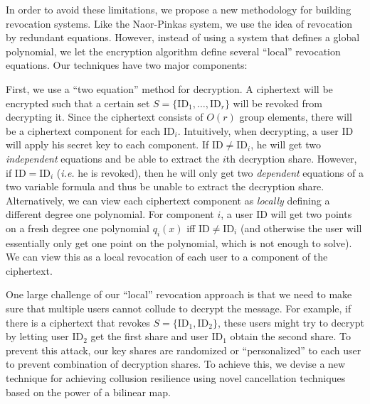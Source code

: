 \documentclass[a4paper, 11pt]{article}
\newcommand{\comment}[1]{}
\theoremstyle{definition}
\newcommand{\ID}{\ensuremath{\textrm{ID}}}
\begin{document}
In order to avoid these limitations, we propose a new methodology for
building revocation systems. Like the Naor-Pinkas system, we use the
idea of revocation by redundant equations. However, instead of using
a system that defines a global polynomial, we let the encryption algorithm
define several ``local'' revocation equations.
Our techniques have two major components:


First, we use a ``two equation'' method for decryption. A ciphertext
will be encrypted such that a certain set $S=\{\ID_1,\ldots,\ID_r \}$
will be revoked from decrypting it. Since the ciphertext consists of
$O(r)$ group elements, there will be a ciphertext component for each
$\ID_i$.  Intuitively, when decrypting, a user $\ID$ will apply his
secret key to each component. If $\ID \neq \ID_i$, he will get two
\emph{independent} equations and be able to extract the $i$th
decryption share. However, if $\ID=\ID_i$ (\emph{i.e.} he is revoked), then he
will only get two \emph{dependent} equations of a two variable formula and thus
be unable to extract the decryption share. Alternatively, we can view each
ciphertext component as \emph{locally} defining a different degree one polynomial.
For component $i$, a user $\ID$ will get two points on a fresh degree one polynomial
$q_i(x)$ iff $\ID \neq \ID_i$ (and otherwise the user will essentially only get one point on the polynomial, which is not enough to solve). We can view this as a local
revocation of each user to a component of the ciphertext.


One large challenge of our ``local'' revocation approach is that we
need to make sure that multiple users cannot collude to decrypt the
message. For example, if there is a ciphertext that revokes $S= \{
\ID_1,\ID_2 \}$, these users might try to decrypt by letting user
$\ID_2$ get the first share and user $\ID_1$ obtain the second share.
To prevent this attack, our key shares are randomized or
``personalized'' to each user to prevent combination of decryption
shares. To achieve this, we devise a new technique for achieving
collusion resilience using novel cancellation techniques based on the
power of a bilinear map.


\comment{
Our techniques are in contrast to all previous revocation schemes with
small key sizes that we are aware of, which used either combinatorial
approaches (either with set systems or tree-based approaches) or
polynomial interpolation based approaches (see the related work
section for more details on previous work).
  Instead, we devise a new
technique for achieving collusion resilience using novel cancellation
techniques based on the power of a bilinear map.  A bilinear map of
the kind we need can be built, for example, from the Weil pairing on
elliptic curve groups.  Our new collusion-resilience technique allows
us to break the bottlenecks that existed in previous systems.
}
\end{document}
